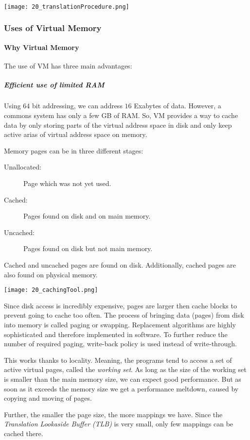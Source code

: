 \texttt{[image: 20\_translationProcedure.png]}

\subsubsection{Uses of Virtual Memory}
\paragraph{Why Virtual Memory}
The use of VM has three main advantages:

\subparagraph{Efficient use of limited RAM}
Using $64$ bit addressing, we can address $16$ Exabytes of data. However, a commons system has only a few GB of RAM. So, VM provides a way to cache data by only storing parts of the virtual address space in disk and only keep active arias of virtual address space on memory. 

Memory pages can be in three different stages:
\begin{description}
    \item[Unallocated:] Page which was not yet used.
    \item[Cached:] Pages found on disk and on main memory.
    \item[Uncached:] Pages found on disk but not main memory.
\end{description}

Cached and uncached pages are found on disk. Additionally, cached  pages are also found on physical memory.

\texttt{[image: 20\_cachingTool.png]}

Since disk access is incredibly expensive, pages are larger then cache blocks to prevent going to cache too often. The process of bringing data (pages) from disk into memory is called paging or swapping. Replacement algorithms are highly sophisticated and therefore implemented in software. To further reduce the number of required paging, write-back policy is used instead of write-through.

This works thanks to locality. Meaning, the programs tend to access a set of active virtual pages, called the \textit{working set}. As long as the size of the working set is smaller than the main memory size, we can expect good performance. But as soon as it exceeds the memory size we get a performance meltdown, caused by copying and moving of pages.

Further, the smaller the page size, the more mappings we have. Since the \textit{Translation Lookaside Buffer (TLB)} is very small, only few mappings can be cached there. 


